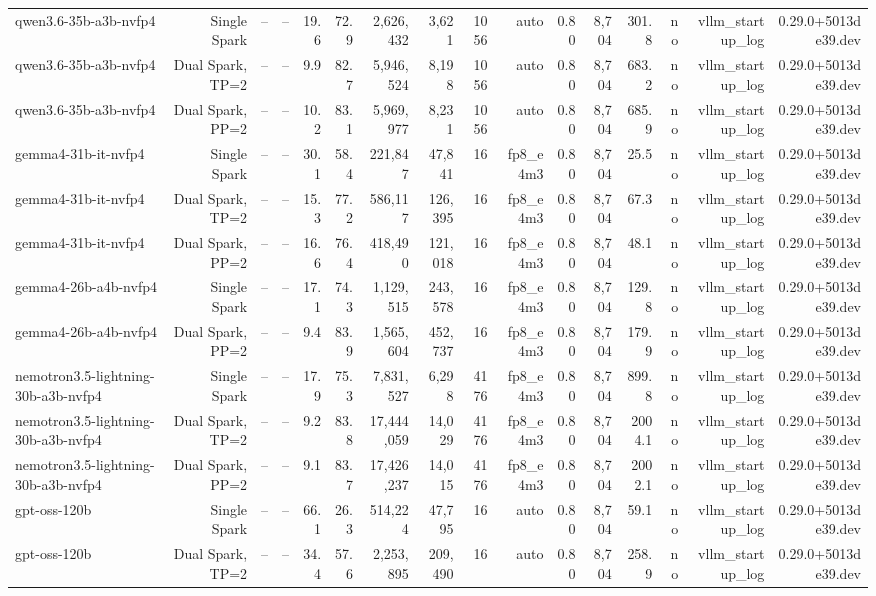 \begin{tabular}{l r r r r r r r r r r r r r r r }
qwen3.6-35b-a3b-nvfp4 & Single Spark & -- & -- & 19.6 & 72.9 & 2,626,432 & 3,621 & 1056 & auto & 0.80 & 8,704 & 301.8 & no & vllm\_startup\_log & 0.29.0+5013de39.dev \\
qwen3.6-35b-a3b-nvfp4 & Dual Spark, TP=2 & -- & -- & 9.9 & 82.7 & 5,946,524 & 8,198 & 1056 & auto & 0.80 & 8,704 & 683.2 & no & vllm\_startup\_log & 0.29.0+5013de39.dev \\
qwen3.6-35b-a3b-nvfp4 & Dual Spark, PP=2 & -- & -- & 10.2 & 83.1 & 5,969,977 & 8,231 & 1056 & auto & 0.80 & 8,704 & 685.9 & no & vllm\_startup\_log & 0.29.0+5013de39.dev \\
gemma4-31b-it-nvfp4 & Single Spark & -- & -- & 30.1 & 58.4 & 221,847 & 47,841 & 16 & fp8\_e4m3 & 0.80 & 8,704 & 25.5 & no & vllm\_startup\_log & 0.29.0+5013de39.dev \\
gemma4-31b-it-nvfp4 & Dual Spark, TP=2 & -- & -- & 15.3 & 77.2 & 586,117 & 126,395 & 16 & fp8\_e4m3 & 0.80 & 8,704 & 67.3 & no & vllm\_startup\_log & 0.29.0+5013de39.dev \\
gemma4-31b-it-nvfp4 & Dual Spark, PP=2 & -- & -- & 16.6 & 76.4 & 418,490 & 121,018 & 16 & fp8\_e4m3 & 0.80 & 8,704 & 48.1 & no & vllm\_startup\_log & 0.29.0+5013de39.dev \\
gemma4-26b-a4b-nvfp4 & Single Spark & -- & -- & 17.1 & 74.3 & 1,129,515 & 243,578 & 16 & fp8\_e4m3 & 0.80 & 8,704 & 129.8 & no & vllm\_startup\_log & 0.29.0+5013de39.dev \\
gemma4-26b-a4b-nvfp4 & Dual Spark, PP=2 & -- & -- & 9.4 & 83.9 & 1,565,604 & 452,737 & 16 & fp8\_e4m3 & 0.80 & 8,704 & 179.9 & no & vllm\_startup\_log & 0.29.0+5013de39.dev \\
nemotron3.5-lightning-30b-a3b-nvfp4 & Single Spark & -- & -- & 17.9 & 75.3 & 7,831,527 & 6,298 & 4176 & fp8\_e4m3 & 0.80 & 8,704 & 899.8 & no & vllm\_startup\_log & 0.29.0+5013de39.dev \\
nemotron3.5-lightning-30b-a3b-nvfp4 & Dual Spark, TP=2 & -- & -- & 9.2 & 83.8 & 17,444,059 & 14,029 & 4176 & fp8\_e4m3 & 0.80 & 8,704 & 2004.1 & no & vllm\_startup\_log & 0.29.0+5013de39.dev \\
nemotron3.5-lightning-30b-a3b-nvfp4 & Dual Spark, PP=2 & -- & -- & 9.1 & 83.7 & 17,426,237 & 14,015 & 4176 & fp8\_e4m3 & 0.80 & 8,704 & 2002.1 & no & vllm\_startup\_log & 0.29.0+5013de39.dev \\
gpt-oss-120b & Single Spark & -- & -- & 66.1 & 26.3 & 514,224 & 47,795 & 16 & auto & 0.80 & 8,704 & 59.1 & no & vllm\_startup\_log & 0.29.0+5013de39.dev \\
gpt-oss-120b & Dual Spark, TP=2 & -- & -- & 34.4 & 57.6 & 2,253,895 & 209,490 & 16 & auto & 0.80 & 8,704 & 258.9 & no & vllm\_startup\_log & 0.29.0+5013de39.dev \\

\end{tabular}
